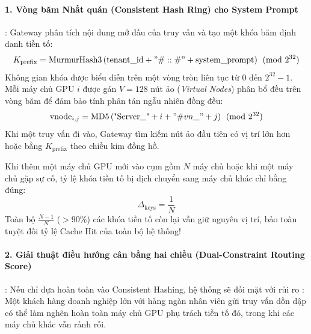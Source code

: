 \paragraph{1. Vòng băm Nhất quán (Consistent Hash Ring) cho System Prompt}:
Gateway phân tích nội dung mở đầu của truy vấn và tạo một khóa băm định danh tiền tố:
\begin{equation}
K_{\text{prefix}} = \text{MurmurHash3}\left(\text{tenant\_id} + "\#::\#" + \text{system\_prompt}\right) \pmod{2^{32}}
\end{equation}
Không gian khóa được biểu diễn trên một vòng tròn liên tục từ $0$ đến $2^{32} - 1$.
Mỗi máy chủ GPU $i$ được gán $V = 128$ nút ảo (\textit{Virtual Nodes}) phân bổ đều trên vòng băm để đảm bảo tính phân tán ngẫu nhiên đồng đều:
\begin{equation}
\text{vnode}_{i, j} = \text{MD5}\left(\text{"Server\_"} + i + "\#vn\_" + j\right) \pmod{2^{32}}
\end{equation}
Khi một truy vấn đi vào, Gateway tìm kiếm nút ảo đầu tiên có vị trí lớn hơn hoặc bằng $K_{\text{prefix}}$ theo chiều kim đồng hồ.
\begin{theorem}
Khi thêm một máy chủ GPU mới vào cụm gồm $N$ máy chủ hoặc khi một máy chủ gặp sự cố, tỷ lệ khóa tiền tố bị dịch chuyển sang máy chủ khác chỉ bằng đúng:
\begin{equation}
\Delta_{\text{keys}} = \frac{1}{N}
\end{equation}
Toàn bộ $\frac{N-1}{N}$ ($> 90\%$) các khóa tiền tố còn lại vẫn giữ nguyên vị trí, bảo toàn tuyệt đối tỷ lệ Cache Hit của toàn bộ hệ thống!
\end{theorem}

\paragraph{2. Giải thuật điều hướng cân bằng hai chiều (Dual-Constraint Routing Score)}:
Nếu chỉ dựa hoàn toàn vào Consistent Hashing, hệ thống sẽ đối mặt với rủi ro : Một khách hàng doanh nghiệp lớn với hàng ngàn nhân viên gửi truy vấn dồn dập có thể làm nghẽn hoàn toàn máy chủ GPU phụ trách tiền tố đó, trong khi các máy chủ khác vẫn rảnh rỗi.

